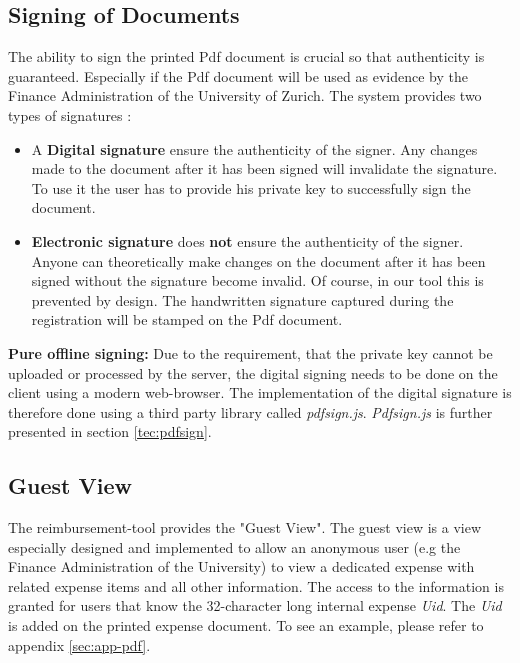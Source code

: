 \subsection{Signing of Documents}
The ability to sign the printed Pdf document is crucial so that authenticity is guaranteed. Especially if the Pdf document will be used as evidence by the Finance Administration of the University of Zurich. The system provides two types of signatures \cite{arx-signature}:
\begin{itemize}
	\item A \textbf{Digital signature} ensure the authenticity of the signer. Any changes made to the document after it has been signed will invalidate the signature. To use it the user has to provide his private key to successfully sign the document.
	\item \textbf{Electronic signature} does \textbf{not} ensure the authenticity of the signer. Anyone can theoretically make changes on the document after it has been signed without the signature become invalid. Of course, in our tool this is prevented by design. The handwritten signature captured during the registration will be stamped on the Pdf document.
\end{itemize}\par

\textbf{Pure offline signing: }Due to the requirement, that the private key cannot be uploaded or processed by the server, the digital signing needs to be done on the client using a modern web-browser. The implementation of the digital signature is therefore done using a third party library called \textit{pdfsign.js}\cite{pdfsign}. \textit{Pdfsign.js}  is further presented in section \ref{tec:pdfsign}.\par

\subsection{Guest View}
The reimbursement-tool provides the "Guest View". The guest view is a view especially designed and implemented to allow an anonymous user (e.g the Finance Administration of the University) to view a dedicated expense with related expense items and all other information. The access to the information is granted for users that know the 32-character long internal expense \textit{Uid}. The \textit{Uid} is added on the printed expense document. To see an example, please refer to appendix \ref{sec:app-pdf}.\par 
 

